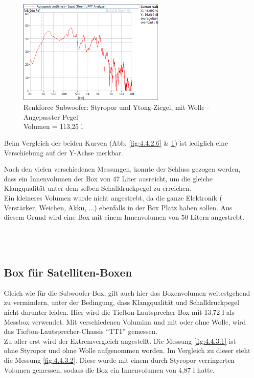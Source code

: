 \begin{figure} [H]
\centering
\includegraphics[width=0.65\textwidth]{img/Optimierung/Sub/RenkforceStyro_113l_Wolle_Angepasst.png}
\caption{Renkforce Subwoofer: Styropor und Ytong-Ziegel, mit Wolle - Angepasster Pegel \\Volumen = 113,25 l}
\label{fig:4.4.2.7}
\end{figure}
Beim Vergleich der beiden Kurven (Abb. \ref{fig:4.4.2.6} \& \ref{fig:4.4.2.7}) ist lediglich eine Verschiebung auf der Y-Achse merkbar.

\newpage
Nach den vielen verschiedenen Messungen, konnte der Schluss gezogen werden, dass ein Innenvolumen der Box von 47 Liter ausreicht, um die gleiche Klangqualität unter dem selben Schalldruckpegel zu erreichen.\\
Ein kleineres Volumen wurde nicht angestrebt, da die ganze Elektronik ( Verstärker, Weichen, Akku, ...) ebenfalls in der Box Platz haben sollen.
Aus diesem Grund wird eine Box mit einem Innenvolumen von 50 Litern angestrebt.\\ \\ \\ \\




\subsection{Box für Satelliten-Boxen}\label{subsec:4.4.3}
Gleich wie für die Subwoofer-Box, gilt auch hier das Boxenvolumen weitestgehend zu vermindern, unter der Bedingung, dass Klangqualität und Schalldruckpegel nicht darunter leiden.
Hier wird die Tiefton-Lautsprecher-Box mit 13,72 l als Messbox verwendet.
Mit verschiedenen Volumina und mit oder ohne Wolle, wird das Tiefton-Lautsprecher-Chassis \enquote{TT1} gemessen.\\
Zu aller erst wird der Extremvergleich angestellt.
Die Messung \ref{fig:4.4.3.1} ist ohne Styropor und ohne Wolle aufgenommen worden.
Im Vergleich zu dieser steht die Messung \ref{fig:4.4.3.2}.
Diese wurde mit einem durch Styropor verringerten Volumen gemessen, sodass die Box ein Innenvolumen von 4,87 l hatte.

